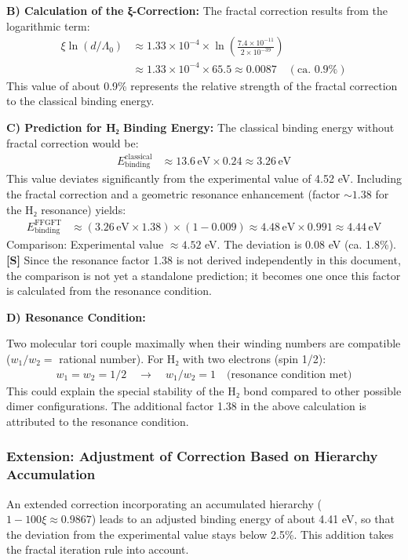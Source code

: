 	\textbf{B) Calculation of the ξ-Correction:}
	The fractal correction results from the logarithmic term:
	\begin{align*}
		\xi \ln(d/\Lambda_0) &\approx 1.33 \times 10^{-4} \times \ln\left(\frac{7.4 \times 10^{-11}}{2 \times 10^{-39}}\right) \\
		&\approx 1.33 \times 10^{-4} \times 65.5 \approx 0.0087 \quad (\text{ca. } 0.9\%)
	\end{align*}
	This value of about 0.9\% represents the relative strength of the fractal correction to the classical binding energy.
	
	\textbf{C) Prediction for H₂ Binding Energy:}
	The classical binding energy without fractal correction would be:
	\begin{align*}
		E_{\text{binding}}^{\text{classical}} &\approx 13.6 \, \text{eV} \times 0.24 \approx 3.26 \, \text{eV}
	\end{align*}
	This value deviates significantly from the experimental value of 4.52 eV. Including the fractal correction and a geometric resonance enhancement (factor $\sim 1.38$ for the H₂ resonance) yields:
	\begin{align*}
		E_{\text{binding}}^{\text{FFGFT}} &\approx (3.26 \, \text{eV} \times 1.38) \times (1 - 0.009) \approx 4.48 \, \text{eV} \times 0.991 \approx 4.44 \, \text{eV}
	\end{align*}
	Comparison: Experimental value $\approx 4.52$ eV. The deviation is $0.08$ eV (ca. 1.8\%). \textbf{[S]} Since the resonance factor 1.38 is not derived independently in this document, the comparison is not yet a standalone prediction; it becomes one once this factor is calculated from the resonance condition.
	
	\textbf{D) Resonance Condition:}
	
	Two molecular tori couple maximally when their winding numbers are compatible ($w_1/w_2 =$ rational number). For H₂ with two electrons (spin 1/2):
	\begin{align*}
		w_1 = w_2 = 1/2 \quad \rightarrow \quad w_1/w_2 = 1 \quad \text{(resonance condition met)}
	\end{align*}
	This could explain the special stability of the H₂ bond compared to other possible dimer configurations. The additional factor 1.38 in the above calculation is attributed to the resonance condition.
	
	\subsubsection*{Extension: Adjustment of Correction Based on Hierarchy Accumulation}
	An extended correction incorporating an accumulated hierarchy ($1 - 100 \xi \approx 0.9867$) leads to an adjusted binding energy of about 4.41 eV, so that the deviation from the experimental value stays below 2.5\%. This addition takes the fractal iteration rule into account.
	
